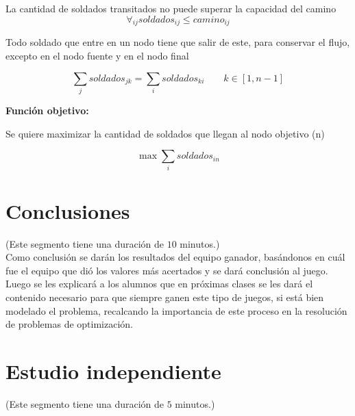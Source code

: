 \documentclass[a4paper,10pt,twocolumn]{article}
\theoremstyle{theorem}
\theoremstyle{definition}
\theoremstyle{remark}
\begin{document}
La cantidad de soldados transitados no puede superar la capacidad del camino
$$
\forall_{ij} soldados_{ij} \le camino_{ij}
$$

Todo soldado que entre en un nodo tiene que salir de este, para conservar el flujo, excepto en el nodo fuente y en el nodo final

$$
\sum_j soldados_{jk} = \sum_i soldados_{ki} \qquad k \in [1,n-1]
$$

\textbf{Función objetivo:}

Se quiere maximizar la cantidad de soldados que llegan al nodo objetivo (n)

$$
\max \sum_i soldados_{in}
$$


\section{Conclusiones} \label{sec:conc}

(Este segmento tiene una duración de $10$ minutos.)\\
 
%

Como conclusión se darán los resultados del equipo ganador, basándonos en cuál fue el equipo que dió los valores más acertados y se dará conclusión al juego.\\

Luego se les explicará a los alumnos que en próximas clases se les dará el contenido necesario para que siempre ganen este tipo de juegos, si está bien modelado el problema, recalcando la importancia de este proceso en la resolución de problemas de optimización.

\section{Estudio independiente} \label{independ}
(Este segmento tiene una duración de $5$ minutos.)\\
 
\end{document}
